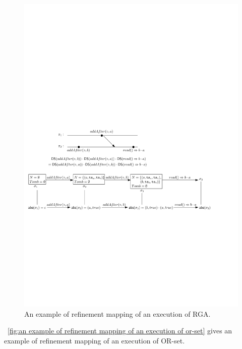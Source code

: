 \begin{figure}[t]
  \centering
  \includegraphics[width=0.85 \textwidth]{figures/RefinementMappingRGA.pdf}
\vspace{-10pt}
  \caption{An example of refinement mapping of an execution of RGA.}
  \label{fig:an example of refinement mapping of an execution of RGA}
\end{figure}



\figurename~\ref{fig:an example of refinement mapping of an execution of or-set} gives an example of refinement mapping of an execution of OR-set. 

